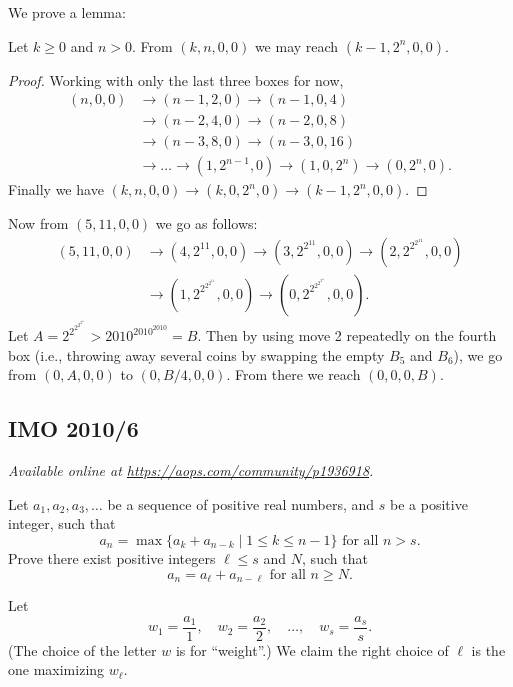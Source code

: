\documentclass[11pt]{scrartcl}
\begin{document}
We prove a lemma:
\begin{claim*}
  Let $k \ge 0$ and $n > 0$.
  From $(k,n,0,0)$ we may reach $(k-1,2^n,0,0)$.
\end{claim*}
\begin{proof}
  Working with only the last three boxes for now,
  \begin{align*}
    (n,0,0) &\to (n-1, 2, 0) \to (n-1, 0, 4) \\
    &\to (n-2, 4, 0) \to (n-2, 0, 8) \\
    &\to (n-3, 8, 0) \to (n-3, 0, 16) \\
    &\to \dots \to (1, 2^{n-1}, 0) \to (1, 0, 2^n) \to (0, 2^n, 0).
  \end{align*}
  Finally we have $(k,n,0,0) \to (k,0,2^n,0) \to (k-1,2^n, 0,0)$.
\end{proof}

Now from $(5,11,0,0)$ we go as follows:
\begin{align*} (5,11,0,0) &\to (4, 2^{11}, 0, 0)
  \to \left(3, 2^{2^{11}}, 0, 0\right)
  \to \left(2, 2^{2^{2^{11}}}, 0, 0\right) \\
  &\to \left( 1, 2^{2^{2^{2^{11}}}}, 0, 0\right)
  \to \left(0, 2^{2^{2^{2^{2^{11}}}}}, 0, 0\right).
\end{align*}
Let $A = 2^{2^{2^{2^{2^{11}}}}} > 2010^{2010^{2010}} = B$.
Then by using move 2 repeatedly on the fourth box
(i.e., throwing away several coins by swapping the empty $B_5$ and $B_6$),
we go from $(0,A,0,0)$ to $(0,B/4,0,0)$.
From there we reach $(0,0,0,B)$.
\pagebreak

\subsection{IMO 2010/6}
\textsl{Available online at \url{https://aops.com/community/p1936918}.}
\begin{mdframed}[style=mdpurplebox,frametitle={Problem statement}]
Let $a_1, a_2, a_3, \dots$ be a sequence of positive real numbers, and $s$ be a positive integer, such that
\[
  a_n =
  \max \{ a_k + a_{n-k} \mid 1 \leq k \leq n-1 \}
  \text{ for all $n > s$}.
\]
Prove there exist positive integers $\ell \leq s$ and $N$, such that
\[
  a_n =
  a_{\ell} + a_{n - \ell} \text{ for all $n \ge N$}.
\]
\end{mdframed}
Let \[ w_1 = \frac{a_1}{1}, \quad w_2 = \frac{a_2}{2},
    \quad \dots, \quad w_s = \frac{a_s}{s}. \]
(The choice of the letter $w$ is for ``weight''.)
We claim the right choice of $\ell$
is the one maximizing $w_\ell$.
\end{document}
